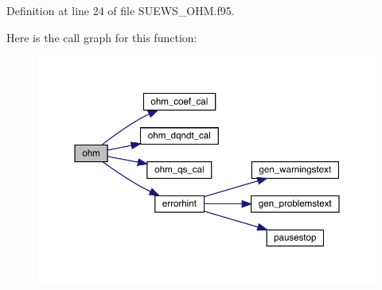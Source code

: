 Definition at line 24 of file S\+U\+E\+W\+S\+\_\+\+O\+H\+M.\+f95.

Here is the call graph for this function\+:\nopagebreak
\begin{figure}[H]
\begin{center}
\leavevmode
\includegraphics[width=350pt]{_s_u_e_w_s___o_h_m_8f95_ab185f57c5ea6cf2099e1287a56748702_cgraph}
\end{center}
\end{figure}
\mbox{\label{_s_u_e_w_s___o_h_m_8f95_afb34d8d06c1f1fcb2543f89f53185ffd}} 
